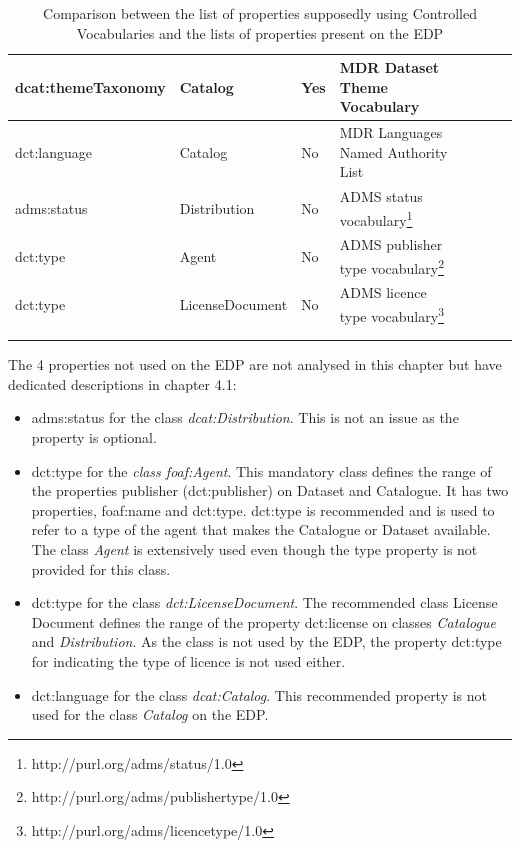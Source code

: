 \documentclass[<options>]{elsarticle}
\begin{document}
\begin{longtable}{*8l}
\rowcolor{gray!10} dcat:themeTaxonomy&Catalog &Yes &MDR Dataset Theme Vocabulary \\ \hline
\rowcolor{gray!10} dct:language &Catalog &No &MDR Languages Named Authority List \\ \hline
\rowcolor{gray!10} adms:status &Distribution &No &ADMS status vocabulary\footnote{http://purl.org/adms/status/1.0} \\ \hline
\rowcolor{gray!10} dct:type &Agent &No &ADMS publisher type vocabulary\footnote{http://purl.org/adms/publishertype/1.0} \\ \hline
\rowcolor{gray!10} dct:type &LicenseDocument &No &ADMS licence type vocabulary\footnote{http://purl.org/adms/licencetype/1.0} \\ \hline

\\ 
\caption{Comparison between the list of properties supposedly using Controlled Vocabularies and the lists of properties present on the EDP}
\end{longtable}

The 4 properties not used on the EDP are not analysed in this chapter but have dedicated descriptions in chapter 4.1:

\begin{itemize}
\item adms:status for the class \textit{dcat:Distribution}. This is not an issue as the property is optional.
\item dct:type for the \textit{class foaf:Agent}. This mandatory class defines the range of the properties publisher (dct:publisher) on Dataset and Catalogue. It has two properties, foaf:name and dct:type. dct:type is recommended and is used to refer to a type of the agent that makes the Catalogue or Dataset available. The class \textit{Agent} is extensively used even though the type property is not provided for this class.
\item dct:type for the class \textit{dct:LicenseDocument}. The recommended class License Document defines the range of the property dct:license on classes \textit{Catalogue} and \textit{Distribution}. As the class is not used by the EDP, the property dct:type for indicating the type of licence is not used either.
\item dct:language for the class \textit{dcat:Catalog}. This recommended property is not used for the class \textit{Catalog} on the EDP.
\end{itemize}
\end{document}
